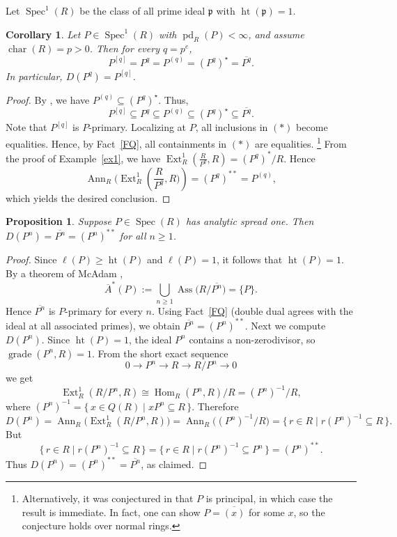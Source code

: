 \documentclass[11pt,a4paper]{amsart}
\numberwithin{equation}{section}
\newtheorem{proposition}[theorem]{Proposition}
\newtheorem{corollary}[theorem]{Corollary}
\DeclareMathOperator{\Ass}{Ass}
\DeclareMathOperator{\grade}{grade}
\DeclareMathOperator{\Ann}{Ann}\DeclareMathOperator{\ann}{Ann}
\DeclareMathOperator{\Spec}{Spec}
\DeclareMathOperator{\Ht}{ht}
\DeclareMathOperator{\pd}{pd}
\DeclareMathOperator{\Ext}{Ext}
\DeclareMathOperator{\Hom}{Hom}
\DeclareMathOperator{\Char}{char}
\newcommand{\fp}{\mathfrak{p}}
\begin{document}
Let $\Spec^1(R)$ be the class of all prime ideal $\fp$ with $\Ht(\mathfrak p)=1$.

\begin{corollary}
	Let $P \in \Spec^1(R)$ with $\pd_R(P) < \infty$, and assume $\Char(R)=p>0$. Then for every $q=p^e$,
	\[
	P^{[q]} = P^q = P^{(q)} = (P^q)^\star = \overline{P^q}.
	\]
	In particular,
	\(
	D(P^q) = P^{[q]}.
	\)
\end{corollary}

\begin{proof}
	By \cite[Theorem 1.1(b)]{HH}, we have
	\(
	P^{(q)} \subseteq (P^q)^\star.
	\)
	Thus,
	\[
	P^{[q]} \subseteq P^q \subseteq P^{(q)} \subseteq (P^q)^\star \subseteq \overline{P^q}. \tag{$\ast$}
	\]
	Note that $P^{[q]}$ is $P$-primary. Localizing at $P$, all inclusions in $(\ast)$ become equalities. Hence, by Fact~\ref{FQ}, all containments in $(\ast)$ are equalities.
\footnote{Alternatively, it was conjectured in \cite{ufd} that $P$ is principal, in which case the result is immediate. In fact, one can show $P=\overline{(x)}$ for some $x$, so the conjecture holds over normal rings.}
	From the proof of Example~\ref{ex1}, we have
	\(
	\Ext^1_R\!(\frac{R}{P^q}, R) = (P^q)^\ast / R.
	\)
	Hence
	\[
	\Ann_R\!(\Ext^1_R\!\left(\frac{R}{P^q}, R)\right)
	= (P^q)^{\ast\ast}
	= P^{(q)},
	\]
	which yields the desired conclusion.
\end{proof}

 

\begin{proposition}\label{6.8}
	Suppose $P \in \Spec(R)$ has analytic spread one. Then 
	\(
	D(P^n)=\overline{P^n}=(P^n)^{**}
	\) for all $n\ge 1$.
\end{proposition}

\begin{proof}
	Since $\ell(P)\ge \Ht(P)$ and $\ell(P)=1$, it follows that $\Ht(P)=1$.
	By a theorem of McAdam \cite{Mcadam},
	\[
	\overline{A}^\ast(P):=\bigcup_{n\ge1}\Ass\!\big(R/\overline{P^n}\big)=\{P\}.
	\]
	Hence $\overline{P^n}$ is $P$-primary for every $n$. Using Fact~\ref{FQ} (double dual agrees with the ideal at all associated primes), we obtain
	\(
	\overline{P^n}=(P^n)^{**}.
	\)
Next we compute $D(P^n)$. Since $\Ht(P)=1$, the ideal $P^n$ contains a non-zerodivisor, so $\grade(P^n,R)=1$. From the short exact sequence
	\[
	0 \longrightarrow P^n \longrightarrow R \longrightarrow R/P^n \longrightarrow 0
	\]
	we get
	\[
	\Ext^1_R(R/P^n,R)\cong \Hom_R(P^n,R)/R=(P^n)^{-1}/R,
	\]
	where $(P^n)^{-1}=\{\,x\in Q(R)\mid xP^n\subseteq R\,\}$.
	Therefore
	\[
	D(P^n)=\Ann_R\!\big(\Ext^1_R(R/P^n,R)\big)
	=\Ann_R\!\big((P^n)^{-1}/R\big)
	=\{\,r\in R \mid r(P^n)^{-1}\subseteq R\,\}.
	\]
	But
	\[
	\{\,r\in R \mid r(P^n)^{-1}\subseteq R\,\}
	=\{\,r\in R \mid r(P^n)^{-1}\subseteq P^n\,\}
	=(P^n)^{**}.
	\]
	Thus $D(P^n)=(P^n)^{**}=\overline{P^n}$, as claimed.
\end{proof}
\end{document}
